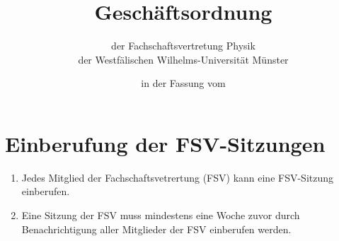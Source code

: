 


\pagestyle{scrheadings}

\title{Geschäftsordnung}
\subtitle{der Fachschaftsvertretung Physik\\
der Westfälischen Wilhelms-Universität Münster}
\date{in der Fassung vom }
\author{}



\maketitle

\section{Einberufung der FSV-Sitzungen}
\begin{enumerate}
	\item Jedes Mitglied der Fachschaftsvetrertung (FSV) kann eine FSV-Sitzung einberufen.
	\item Eine Sitzung der FSV muss mindestens eine Woche zuvor durch Benachrichtigung aller Mitglieder der FSV einberufen werden.
\end{enumerate}

